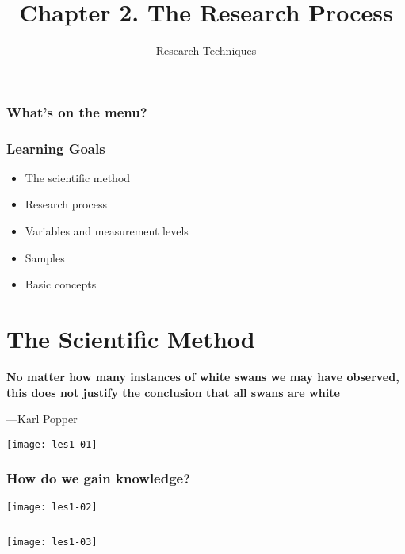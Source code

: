 \documentclass[aspectratio=169]{beamer}
\title{Chapter 2. The Research Process}
\subtitle{Research Techniques}
\begin{document}
\begin{frame}
  \maketitle
\end{frame}

\begin{frame}
  \frametitle{What's on the menu?}
  
  \tableofcontents
\end{frame}

\begin{frame}
  \frametitle{Learning Goals}
  
  \begin{itemize}
    \item The scientific method
    \item Research process
    \item Variables and measurement levels
    \item Samples
    \item Basic concepts
  \end{itemize}
\end{frame}

\section{The Scientific Method}


\begin{frame}[plain]
  \bfseries\Large
  No matter how many instances of white swans we may have observed, this does not justify the conclusion that all swans are white
  
  \bigskip
  
  ---Karl Popper
\end{frame}

\begin{frame}[plain]
  \centering
  \texttt{[image: les1-01]}
\end{frame}

\begin{frame}
  \frametitle{How do we gain knowledge?}
  
  \centering
  \texttt{[image: les1-02]}
\end{frame}

\begin{frame}[plain,c]
  \begin{columns}
    \column{\dimexpr\paperwidth}
    \texttt{[image: les1-03]}
  \end{columns}
\end{frame}
\end{document}
